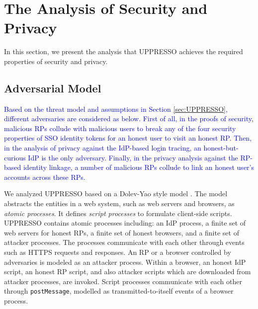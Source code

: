 \section{The Analysis of Security and Privacy}
\label{sec:analysis}
In this section, we present the analysis that UPPRESSO achieves the required properties of security and privacy.

\subsection{Adversarial Model}
\label{adver-model}
\textcolor{blue}{Based on the threat model and assumptions in Section \ref{sec:UPPRESSO},
    different adversaries are considered as below.
First of all, in the proofs of security,
    malicious RPs collude with malicious users
        to break any of the four security properties of SSO identity tokens for an honest user to visit an honest RP.
Then, in the analysis of privacy against the IdP-based login tracing,
   an honest-but-curious IdP is the only adversary.
Finally,
    in the privacy analysis against the RP-based identity linkage,
    a number of malicious RPs collude to link an honest user's accounts across these RPs.}

We analyzed UPPRESSO %
     based on a Dolev-Yao style model \cite{SPRESSO}.
The model abstracts the entities in a web system,
    such as web servers and browsers,
    as \emph{atomic processes}. %
It defines \emph{script processes} to formulate client-side scripts.
%
%
%
%
UPPRESSO contains atomic processes including:
an IdP process,
    a finite set of web servers for honest RPs, a finite set of honest browsers, and a finite set of attacker processes.
The processes communicate with each other through events such as HTTPS requests and responses.
An RP or a browser controlled by adversaries is modeled as an attacker process.
Within a browser,
 an honest IdP script, an honest RP script, and also attacker scripts which are downloaded from attacker processes,
  are invoked.
Script processes communicate with each other through \verb+postMessage+,
    modelled as transmitted-to-itself events of a browser process.


